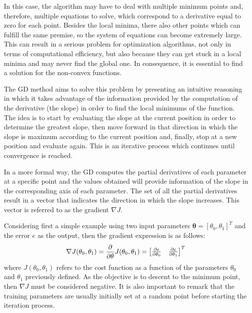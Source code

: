 \documentclass[a4paper, report, oneside, UKenglish]{memoir}
\newcommand{\btheta}{\boldsymbol{\theta}}
\begin{document}
In this case, the algorithm may have to deal with multiple minimum points and, therefore, multiple equations to solve, which correspond to a derivative equal to zero for each point. Besides the local minima, there also other points which can fulfill the same premise, so the system of equations can become extremely large. This can result in a serious problem for optimization algorithms, not only in terms of computational efficiency, but also because they can get stuck in a local minima and may never find the global one. In consequence, it is essential to find a solution for the non-convex functions. 

The GD method aims to solve this problem by presenting an intuitive reasoning in which it takes advantage of the information provided by the computation of the derivative (the slope) in order to find the local minimums of the function. The idea is to start by evaluating the slope at the current position in order to determine the greatest slope, then move forward in that direction in which the slope is maximum according to the current position and, finally, stop at a new position and evaluate again. This is an iterative process which continues until convergence is reached. 

In a more formal way, the GD computes the partial derivatives of each parameter at a specific point and the values obtained will provide information of the slope in the corresponding axis of each parameter. The set of all the partial derivatives result in a vector that indicates the direction in which the slope increases. This vector is referred to as the gradient $\nabla J$. 

Considering first a simple example using two input parameters $\btheta = [\theta_{0}, \theta_{1}]^T$ and the error $e$ as the output, then the gradient expression is as follows:
\begin{equation}
    \nabla J(\theta_{0},\theta_{1}) = \pdv{}{\theta} J(\theta_{0},\theta_{1}) = \begin{bmatrix}
                                                                                \pdv{e}{\theta_{0}} &                                 \pdv{e}{\theta_{1}}\\
                                                                                \end{bmatrix}^T
\end{equation}
where $J(\theta_{0},\theta_{1})$ refers to the cost function as a function of the parameters $\theta_{0}$ and $\theta_{1}$ previously defined. As the objective is to descent to the minimum point, then $\nabla J$ must be considered negative. It is also important to remark that the training parameters are usually initially set at a random point before starting the iteration process.
\end{document}
